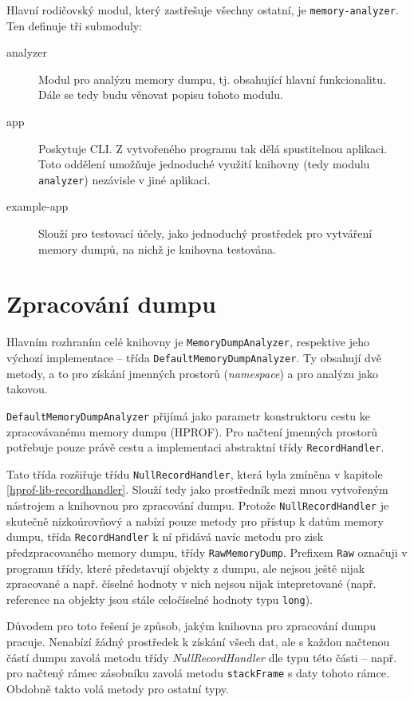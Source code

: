Hlavní rodičovský modul, který zastřešuje všechny ostatní, je \texttt{memory-analyzer}. Ten definuje tři submoduly:

\begin{description}
    \item[analyzer] Modul pro analýzu memory dumpu, tj. obsahující hlavní funkcionalitu. Dále se tedy budu věnovat popisu tohoto modulu.
    \item[app] Poskytuje CLI. Z vytvořeného programu tak dělá spustitelnou aplikaci. Toto oddělení umožňuje jednoduché využití knihovny (tedy modulu \texttt{analyzer}) nezávisle v jiné aplikaci.
    \item[example-app] Slouží pro testovací účely, jako jednoduchý prostředek pro vytváření memory dumpů, na nichž je knihovna testována.  
\end{description}

\section{Zpracování dumpu}
Hlavním rozhraním celé knihovny je \texttt{MemoryDumpAnalyzer}, respektive jeho výchozí implementace -- třída \texttt{DefaultMemoryDumpAnalyzer}. Ty obsahují dvě metody, a to pro získání jmenných prostorů (\textit{namespace}) a pro analýzu jako takovou.

\texttt{DefaultMemoryDumpAnalyzer} přijímá jako parametr konstruktoru cestu ke zpracovávanému memory dumpu (HPROF). Pro načtení jmenných prostorů potřebuje pouze právě cestu a implementaci abstraktní třídy \texttt{RecordHandler}.

Tato třída rozšiřuje třídu \texttt{NullRecordHandler}, která byla zmíněna v kapitole \ref{hprof-lib-recordhandler}. Slouží tedy jako prostředník mezi mnou vytvořeným nástrojem a knihovnou pro zpracování dumpu. Protože \texttt{NullRecordHandler} je skutečně nízkoúrovňový a nabízí pouze metody pro přístup k datům memory dumpu, třída \texttt{RecordHandler} k ní přidává navíc metodu pro zisk předzpracovaného memory dumpu, třídy \texttt{RawMemoryDump}. Prefixem \texttt{Raw} označuji v programu třídy, které představují objekty z dumpu, ale nejsou ještě nijak zpracované a např. číselné hodnoty v nich nejsou nijak intepretované (např. reference na objekty jsou stále celočíselné hodnoty typu \texttt{long}).

Důvodem pro toto řešení je způsob, jakým knihovna pro zpracování dumpu pracuje. Nenabízí žádný prostředek k získání všech dat, ale s každou načtenou částí dumpu zavolá metodu třídy \textit{NullRecordHandler} dle typu této části -- např. pro načtený rámec zásobníku zavolá metodu \texttt{stackFrame} s daty tohoto rámce. Obdobně takto volá metody pro ostatní typy.

